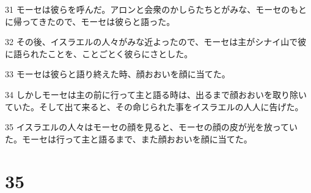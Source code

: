 \par 31 モーセは彼らを呼んだ。アロンと会衆のかしらたちとがみな、モーセのもとに帰ってきたので、モーセは彼らと語った。
\par 32 その後、イスラエルの人々がみな近よったので、モーセは主がシナイ山で彼に語られたことを、ことごとく彼らにさとした。
\par 33 モーセは彼らと語り終えた時、顔おおいを顔に当てた。
\par 34 しかしモーセは主の前に行って主と語る時は、出るまで顔おおいを取り除いていた。そして出て来ると、その命じられた事をイスラエルの人人に告げた。
\par 35 イスラエルの人々はモーセの顔を見ると、モーセの顔の皮が光を放っていた。モーセは行って主と語るまで、また顔おおいを顔に当てた。

\chapter{35}

